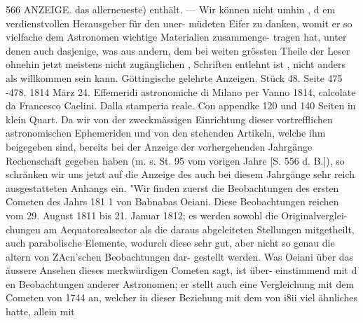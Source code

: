 \documentclass[12pt,a4paper]{article}
\begin{document}
\newpage
566 ANZEIGE.\newline
das allerneueste) enthält. --- Wir können nicht umhin , d em verdienstvollen Herausgeber für den uner-\newline
müdeten Eifer zu danken, womit er so vielfache dem Astronomen wichtige Materialien zusammenge-\newline
tragen hat, unter denen auch dasjenige, was aus andern, dem bei weiten grössten Theile der Leser\newline
ohnehin jetzt meistens nicht zugänglichen , Schriften entlehnt ist , nicht anders als willkommen sein\newline
kann.\newline
Göttingische gelehrte Anzeigen. Stück 48. Seite 475 \textbullet{} -478. 1814 März 24.\newline
Effemeridi astronomiche di Milano per Vanno 1814, calcolate da Francesco Caelini. Dalla stamperia\newline
reale. Con appendke 120 und 140 Seiten in klein Quart.\newline
Da wir von der zweckmässigen Einrichtung dieser vortrefflichen astronomischen Ephemeriden und\newline
von den stehenden Artikeln, welche ihm beigegeben sind, bereits bei der Anzeige der vorhergehenden\newline
Jahrgänge Rechenschaft gegeben haben (m. s. St. 95 vom vorigen Jahre [S. 556 d. B.]), so schränken\newline
wir uns jetzt auf die Anzeige des auch bei diesem Jahrgänge sehr reich ausgestatteten Anhangs ein.\newline
"Wir finden zuerst die Beobachtungen des ersten Cometen des Jahrs 181 1 von Babnabas Oeiani. Diese\newline
Beobachtungen reichen vom 29. August 1811 bis 21. Januar 1812; es werden sowohl die Originalverglei-\newline
chungeu am Aequatorealsector als die daraus abgeleiteten Stellungen mitgetheilt, auch parabolische\newline
Elemente, wodurch diese sehr gut, aber nicht so genau die altern von ZAcn'schen Beobachtungen dar-\newline
gestellt werden. Was Oeiani über das äussere Ansehen dieses merkwürdigen Cometen sagt, ist über-\newline
einstimmend mit d en Beobachtungen anderer Astronomen; er stellt auch eine Vergleichung mit dem\newline
Cometen von 1744 an, welcher in dieser Beziehung mit dem von i8ii viel ähnliches hatte, allein mit\newline
\end{document}
